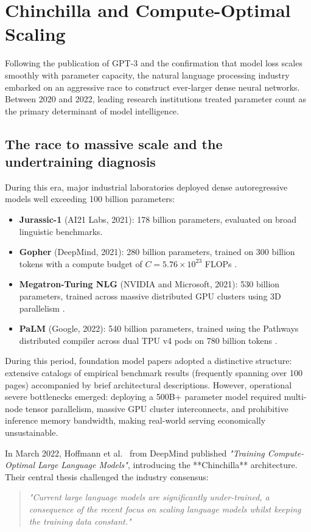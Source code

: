 \documentclass[../../main.tex]{subfiles}
\begin{document}
\section{Chinchilla and Compute-Optimal Scaling}
\label{sec:chinchilla_scaling}

Following the publication of GPT-3 and the confirmation that model loss scales smoothly with parameter capacity, the natural language processing industry embarked on an aggressive race to construct ever-larger dense neural networks. Between 2020 and 2022, leading research institutions treated parameter count as the primary determinant of model intelligence.


\subsection{The race to massive scale and the undertraining diagnosis}
\label{subsec:undertraining_diagnosis}

During this era, major industrial laboratories deployed dense autoregressive models well exceeding 100 billion parameters:
\begin{itemize}
    \item \textbf{Jurassic-1} (AI21 Labs, 2021): 178 billion parameters, evaluated on broad linguistic benchmarks.
    \item \textbf{Gopher} (DeepMind, 2021): 280 billion parameters, trained on 300 billion tokens with a compute budget of $C = 5.76 \times 10^{23}$ FLOPs \cite{rae2021gopher}.
    \item \textbf{Megatron-Turing NLG} (NVIDIA and Microsoft, 2021): 530 billion parameters, trained across massive distributed GPU clusters using 3D parallelism \cite{smith2022mtnlg}.
    \item \textbf{PaLM} (Google, 2022): 540 billion parameters, trained using the Pathways distributed compiler across dual TPU v4 pods on 780 billion tokens \cite{chowdhery2023palm}.
\end{itemize}

During this period, foundation model papers adopted a distinctive structure: extensive catalogs of empirical benchmark results (frequently spanning over 100 pages) accompanied by brief architectural descriptions. However, operational severe bottlenecks emerged: deploying a 500B+ parameter model required multi-node tensor parallelism, massive GPU cluster interconnects, and prohibitive inference memory bandwidth, making real-world serving economically unsustainable.

In March 2022, Hoffmann et al.~\cite{hoffmann2022} from DeepMind published \emph{"Training Compute-Optimal Large Language Models"}, introducing the **Chinchilla** architecture. Their central thesis challenged the industry consensus:
\begin{quote}
\emph{"Current large language models are significantly under-trained, a consequence of the recent focus on scaling language models whilst keeping the training data constant."}
\end{quote}
\end{document}
